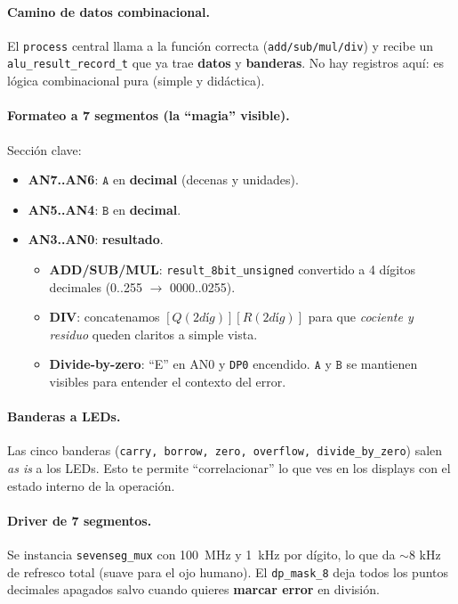 \documentclass[a4paper,12pt]{article}
\begin{document}
\paragraph{Camino de datos combinacional.}
El \texttt{process} central llama a la función correcta (\texttt{add/sub/mul/div}) y recibe un \texttt{alu\_result\_record\_t} que ya trae \textbf{datos} y \textbf{banderas}. No hay registros aquí: es lógica combinacional pura (simple y didáctica).

\paragraph{Formateo a 7 segmentos (la “magia” visible).}
Sección clave:
\begin{itemize}
  \item \textbf{AN7..AN6}: \(\texttt{A}\) en \textbf{decimal} (decenas y unidades).  
  \item \textbf{AN5..AN4}: \(\texttt{B}\) en \textbf{decimal}.  
  \item \textbf{AN3..AN0}: \textbf{resultado}.  
    \begin{itemize}
      \item \textbf{ADD/SUB/MUL}: \texttt{result\_8bit\_unsigned} convertido a 4 dígitos decimales (0..255 \(\rightarrow\) 0000..0255).  
      \item \textbf{DIV}: concatenamos \([Q(2 díg)][R(2 díg)]\) para que \emph{cociente y residuo} queden claritos a simple vista.  
      \item \textbf{Divide-by-zero}: “E” en AN0 y \texttt{DP0} encendido. \(\texttt{A}\) y \(\texttt{B}\) se mantienen visibles para entender el contexto del error.
    \end{itemize}
\end{itemize}

\paragraph{Banderas a LEDs.}
Las cinco banderas (\texttt{carry, borrow, zero, overflow, divide\_by\_zero}) salen \emph{as is} a los LEDs. Esto te permite “correlacionar” lo que ves en los displays con el estado interno de la operación.

\paragraph{Driver de 7 segmentos.}
Se instancia \texttt{sevenseg\_mux} con 100~MHz y 1~kHz por dígito, lo que da \(\sim 8\) kHz de refresco total (suave para el ojo humano). El \texttt{dp\_mask\_8} deja todos los puntos decimales apagados salvo cuando quieres \textbf{marcar error} en división.
\end{document}
